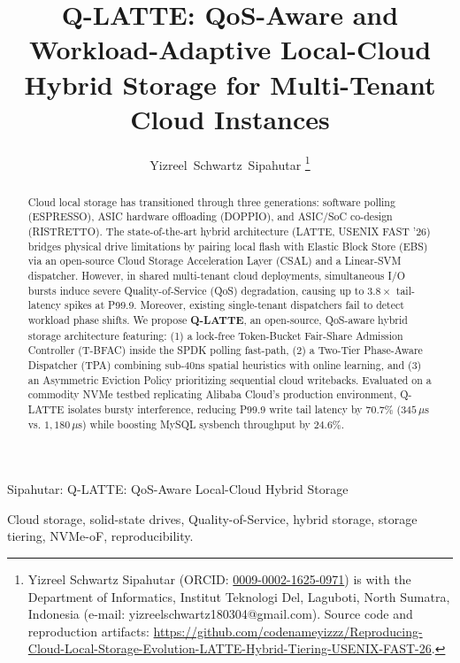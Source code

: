 \documentclass[lettersize,journal]{IEEEtran}
\begin{document}
\title{Q-LATTE: QoS-Aware and Workload-Adaptive Local-Cloud Hybrid Storage for Multi-Tenant Cloud Instances}

\author{Yizreel~Schwartz~Sipahutar%
\thanks{Yizreel Schwartz Sipahutar (ORCID: \href{https://orcid.org/0009-0002-1625-0971}{0009-0002-1625-0971}) is with the Department of Informatics, Institut Teknologi Del, Laguboti, North Sumatra, Indonesia (e-mail: yizreelschwartz180304@gmail.com). Source code and reproduction artifacts: \url{https://github.com/codenameyizzz/Reproducing-Cloud-Local-Storage-Evolution-LATTE-Hybrid-Tiering-USENIX-FAST-26}.}%
}

%
{Sipahutar: Q-LATTE: QoS-Aware Local-Cloud Hybrid Storage}

\maketitle

\begin{abstract}
Cloud local storage has transitioned through three generations: software polling (ESPRESSO), ASIC hardware offloading (DOPPIO), and ASIC/SoC co-design (RISTRETTO). The state-of-the-art hybrid architecture (LATTE, USENIX FAST '26) bridges physical drive limitations by pairing local flash with Elastic Block Store (EBS) via an open-source Cloud Storage Acceleration Layer (CSAL) and a Linear-SVM dispatcher. However, in shared multi-tenant cloud deployments, simultaneous I/O bursts induce severe Quality-of-Service (QoS) degradation, causing up to $3.8\times$ tail-latency spikes at P99.9. Moreover, existing single-tenant dispatchers fail to detect workload phase shifts. We propose \textbf{Q-LATTE}, an open-source, QoS-aware hybrid storage architecture featuring: (1) a lock-free Token-Bucket Fair-Share Admission Controller (T-BFAC) inside the SPDK polling fast-path, (2) a Two-Tier Phase-Aware Dispatcher (TPA) combining sub-40ns spatial heuristics with online learning, and (3) an Asymmetric Eviction Policy prioritizing sequential cloud writebacks. Evaluated on a commodity NVMe testbed replicating Alibaba Cloud's production environment, Q-LATTE isolates bursty interference, reducing P99.9 write tail latency by $70.7\%$ ($345\,\mu\text{s}$ vs. $1,180\,\mu\text{s}$) while boosting MySQL sysbench throughput by $24.6\%$.
\end{abstract}

\begin{IEEEkeywords}
Cloud storage, solid-state drives, Quality-of-Service, hybrid storage, storage tiering, NVMe-oF, reproducibility.
\end{IEEEkeywords}
\end{document}

